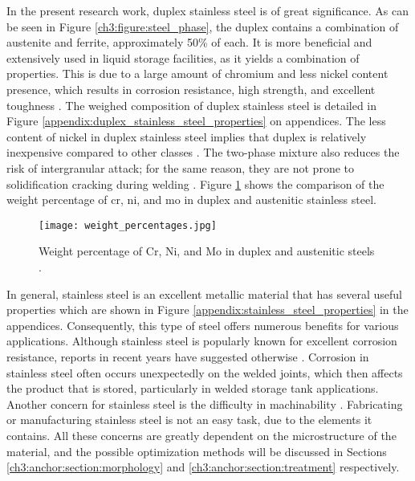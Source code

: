 In the present research work, duplex stainless steel is of great significance. As can be seen in Figure \ref{ch3:figure:steel_phase}, the duplex contains a combination of austenite and ferrite, approximately 50\% of each. It is more beneficial and extensively used in liquid storage facilities, as it yields a combination of properties. This is due to a large amount of chromium and less nickel content presence, which results in corrosion resistance, high strength, and excellent toughness \cite{gunn1997duplex}. The weighed composition of duplex stainless steel is detailed in Figure \ref{appendix:duplex_stainless_steel_properties} on appendices. The less content of nickel in duplex stainless steel implies that duplex is relatively inexpensive compared to other classes \cite{sourmail2005stainless}. The two-phase mixture also reduces the risk of intergranular attack; for the same reason, they are not prone to solidification cracking during welding \cite{sourmail2005stainless}. Figure \ref{ch3:figure:weight} shows the comparison of the weight percentage of \acrfull{cr}, \acrfull{ni}, and \acrfull{mo} in duplex and austenitic stainless steel.
 
\begin{figure}[H]
    \centering
    \texttt{[image: weight\_percentages.jpg]}
    \caption{Weight percentage of Cr, Ni, and Mo in duplex and austenitic steels \cite{sourmail2005stainless}.}
    \label{ch3:figure:weight}
\end{figure}

In general, stainless steel is an excellent metallic material that has several useful properties which are shown in Figure \ref{appendix:stainless_steel_properties} in the appendices. Consequently, this type of steel offers numerous benefits for various applications. Although stainless steel is popularly known for excellent corrosion resistance, reports in recent years have suggested otherwise \cite{karayan2014weld}. Corrosion in stainless steel often occurs unexpectedly on the welded joints, which then affects the product that is stored, particularly in welded storage tank applications. Another concern for stainless steel is the difficulty in machinability \cite{grzesik2008advanced}. Fabricating or manufacturing stainless steel is not an easy task, due to the elements it contains. All these concerns are greatly dependent on the microstructure of the material, and the possible optimization methods will be discussed in Sections \ref{ch3:anchor:section:morphology} and \ref{ch3:anchor:section:treatment} respectively.

